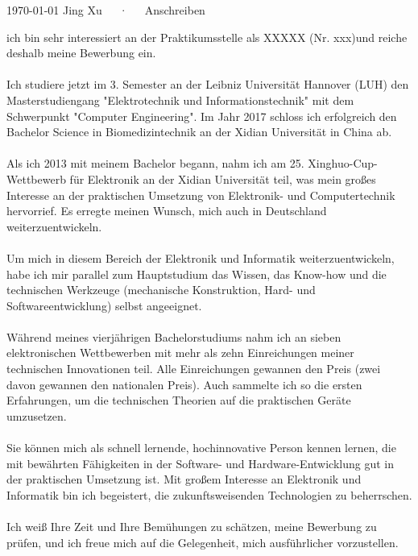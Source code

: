 \documentclass[11pt, a4paper]{awesome-cv}
\providecommand{\applicatename}{XXXXX (Nr. xxx)}
\begin{document}
\makecvheader[R]

\makecvfooter
  {\today}
  {Jing Xu~~~·~~~Anschreiben}
  {}

\makelettertitle

\begin{cvletter}


ich bin sehr interessiert an der Praktikumsstelle als \applicatename und reiche deshalb meine Bewerbung ein.\\\\
Ich studiere jetzt im 3. Semester an der Leibniz Universität Hannover (LUH) den Masterstudiengang "Elektrotechnik und Informationstechnik" mit dem Schwerpunkt "Computer Engineering". Im Jahr 2017 schloss ich erfolgreich den Bachelor Science in Biomedizintechnik an der Xidian Universität in China ab.\\\\
Als ich 2013 mit meinem Bachelor begann, nahm ich am 25. Xinghuo-Cup-Wettbewerb für Elektronik an der Xidian Universität teil, was mein großes Interesse an der praktischen Umsetzung von Elektronik- und Computertechnik hervorrief. Es erregte meinen Wunsch, mich auch in Deutschland weiterzuentwickeln.\\\\
Um mich in diesem Bereich der Elektronik und Informatik weiterzuentwickeln, habe ich mir parallel zum Hauptstudium das Wissen, das Know-how und die technischen Werkzeuge (mechanische Konstruktion, Hard- und Softwareentwicklung) selbst angeeignet.\\\\
Während meines vierjährigen Bachelorstudiums nahm ich an sieben elektronischen Wettbewerben mit mehr als zehn Einreichungen meiner technischen Innovationen teil. Alle Einreichungen gewannen den Preis (zwei davon gewannen den nationalen Preis). Auch sammelte ich so die ersten Erfahrungen, um die technischen Theorien auf die praktischen Geräte umzusetzen.\\\\
Sie können mich als schnell lernende, hochinnovative Person kennen lernen, die mit bewährten Fähigkeiten in der Software- und Hardware-Entwicklung gut in der praktischen Umsetzung ist. Mit großem Interesse an Elektronik und Informatik bin ich begeistert, die zukunftsweisenden Technologien zu beherrschen.\\\\
Ich weiß Ihre Zeit und Ihre Bemühungen zu schätzen, meine Bewerbung zu prüfen, und ich freue mich auf die Gelegenheit, mich ausführlicher vorzustellen.\\\\



\end{cvletter}


\makeletterclosing
\end{document}
